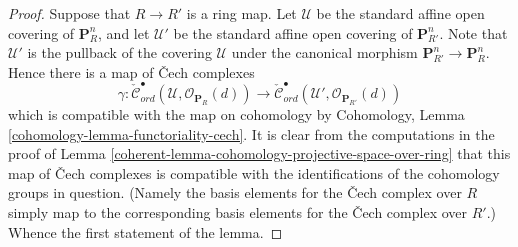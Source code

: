 \begin{proof}

Suppose that $R \to R'$ is a ring map.
Let $\mathcal{U}$ be the standard affine open covering of $\mathbf{P}^n_R$,
and let $\mathcal{U}'$ be the standard affine open covering of
$\mathbf{P}^n_{R'}$. Note that $\mathcal{U}'$ is the pullback of the covering
$\mathcal{U}$ under the canonical morphism
$\mathbf{P}^n_{R'} \to \mathbf{P}^n_R$. Hence there
is a map of {\v C}ech complexes
$$
\gamma :
\check{\mathcal{C}}_{ord}^\bullet(\mathcal{U},
\mathcal{O}_{\mathbf{P}_R}(d))
\longrightarrow
\check{\mathcal{C}}_{ord}^\bullet(\mathcal{U}',
\mathcal{O}_{\mathbf{P}_{R'}}(d))
$$
which is compatible with the map on cohomology by
Cohomology, Lemma \ref{cohomology-lemma-functoriality-cech}.
It is clear from the computations in the proof of
Lemma \ref{coherent-lemma-cohomology-projective-space-over-ring}
that this map of {\v C}ech complexes is compatible with the identifications
of the cohomology groups in question. (Namely the basis elements for
the {\v C}ech complex over $R$ simply map to the corresponding basis elements
for the {\v C}ech complex over $R'$.) Whence the first statement of the lemma.


\end{proof}
